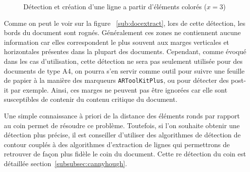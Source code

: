 \begin{figure}[H]
\centering
      \caption{Détection et création d'une ligne a partir d'éléments colorés ($x = 3$)}
      \label{fig:doc:linecluster}
\end{figure}

Comme on peut le voir sur la figure ~\ref{sub:docextract}, lors de cette détection, les bords du document sont rognés. Généralement ces zones ne contiennent aucune information car elles correspondent le plus souvent aux marges verticales et horizontales présentes dans la plupart des documents. Cependant, comme évoqué dans les cas d'utilisation, cette détection ne sera pas seulement utilisée pour des documents de type A4, on pourra s'en servir comme outil pour suivre une feuille de papier à la manière des marqueurs \texttt{ARToolKitPlus}, ou pour détecter des post-it par exemple. Ainsi, ces marges ne peuvent pas être ignorées car elle sont susceptibles de contenir du contenu critique du document.

Une simple connaissance à priori de la distance des éléments ronds par rapport au coin permet de résoudre ce problème. Toutefois, si l'on souhaite obtenir une détection plus précise, il est conseiller d'utiliser des algorithmes de détection de contour couplés à des algorithmes d'extraction de lignes qui permettrons de retrouver de façon plus fidèle le coin du document. Cette re détection du coin est détaillée section~\ref{subsubsec:cannyhough}.

